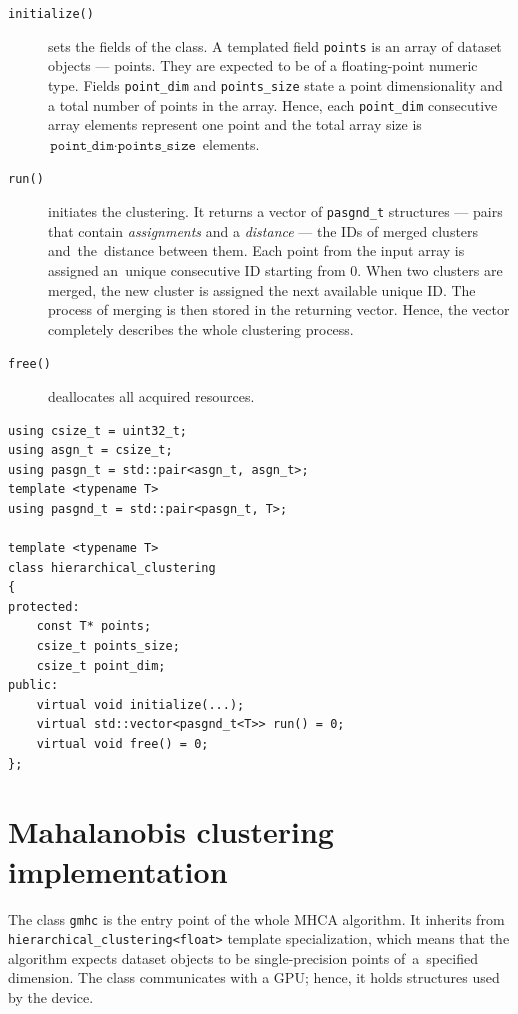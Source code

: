 \begin{description}
	\item[\texttt{initialize()}] sets the fields of the class. A templated field \texttt{points} is an array of dataset objects --- points. They are expected to be of a floating-point numeric type. Fields \texttt{point\_dim} and \texttt{points\_size} state a point dimensionality and a total number of points in the array. Hence, each \texttt{point\_dim} consecutive array elements represent one point and the total array size is~$\texttt{point\_dim}\cdot\texttt{points\_size}$ elements.
	
	\item[\texttt{run()}] initiates the clustering. It returns a vector of \texttt{pasgnd\_t} structures --- pairs that contain \emph{assignments} and a \emph{distance} --- the IDs of merged clusters and~the~distance between them. Each point from the input array is assigned an~unique consecutive ID starting from $0$. When two clusters are merged, the new cluster is assigned the next available unique ID. The process of merging is then stored in the returning vector. Hence, the vector completely describes the whole clustering process.
	
	\item[\texttt{free()}] deallocates all acquired resources.
\end{description}

\begin{lstlisting}[caption={A summary of \texttt{hierarchical\_clustering} header file.},label={lst03:hc}]
using csize_t = uint32_t;
using asgn_t = csize_t;
using pasgn_t = std::pair<asgn_t, asgn_t>;
template <typename T>
using pasgnd_t = std::pair<pasgn_t, T>;

template <typename T>
class hierarchical_clustering
{
protected:
	const T* points;
	csize_t points_size;
	csize_t point_dim;
public:
	virtual void initialize(...);
	virtual std::vector<pasgnd_t<T>> run() = 0;
	virtual void free() = 0;
};
\end{lstlisting}

\section{Mahalanobis clustering implementation}

The class \texttt{gmhc} is the entry point of the whole  MHCA algorithm. It inherits from \texttt{hierarchical\_clustering<float>} template specialization, which means that the algorithm expects dataset objects to be single-precision points of~a~specified dimension. The class communicates
with a GPU; hence, it holds structures used by the device.

